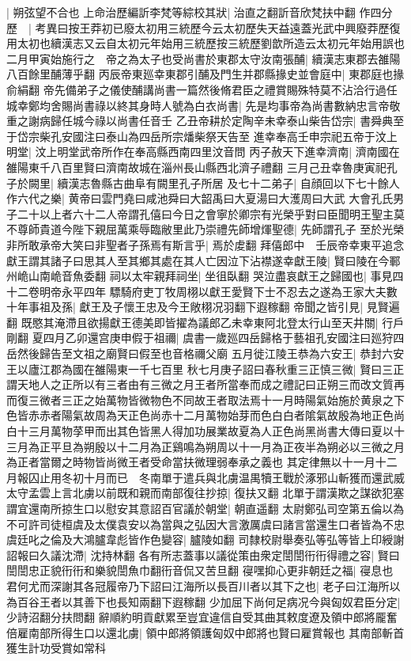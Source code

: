 |{
	朔弦望不合也}
上命治歷編訢李梵等綜校其狀|{
	治直之翻訢音欣梵扶中翻}
作四分歷　|{
	考異曰按王莽初已廢太初用三統歷今云太初歷失天益遠蓋光武中興廢莽歷復用太初也續漢志又云自太初元年始用三統歷按三統歷劉歆所造云太初元年始用誤也}
二月甲寅始施行之　帝之為太子也受尚書於東郡太守汝南張酺|{
	續漢志東郡去雒陽八百餘里酺薄乎翻}
丙辰帝東廵幸東郡引酺及門生并郡縣掾史並會庭中|{
	東郡庭也掾俞絹翻}
帝先備弟子之儀使酺講尚書一篇然後脩君臣之禮賞賜殊特莫不沾洽行過任城幸鄭均舍賜尚書祿以終其身時人號為白衣尚書|{
	先是均事帝為尚書數納忠言帝敬重之謝病歸任城今祿以尚書任音壬}
乙丑帝耕於定陶辛未幸泰山柴告岱宗|{
	書舜典至于岱宗柴孔安國注曰泰山為四岳所宗燔柴祭天告至}
進幸奉高壬申宗祀五帝于汶上明堂|{
	汶上明堂武帝所作在奉高縣西南四里汶音問}
丙子赦天下進幸濟南|{
	濟南國在雒陽東千八百里賢曰濟南故城在淄州長山縣西北濟子禮翻}
三月己丑幸魯庚寅祀孔子於闕里|{
	續漢志魯縣古曲阜有闕里孔子所居}
及七十二弟子|{
	自顔回以下七十餘人}
作六代之樂|{
	黄帝曰雲門堯曰咸池舜曰大韶禹曰大夏湯曰大濩周曰大武}
大會孔氏男子二十以上者六十二人帝謂孔僖曰今日之會寧於卿宗有光榮乎對曰臣聞明王聖主莫不尊師貴道今陛下親屈萬乘辱臨敝里此乃崇禮先師增煇聖德|{
	先師謂孔子}
至於光榮非所敢承帝大笑曰非聖者子孫焉有斯言乎|{
	焉於䖍翻}
拜僖郎中　壬辰帝幸東平追念獻王謂其諸子曰思其人至其鄉其處在其人亡因泣下沾襟遂幸獻王陵|{
	賢曰陵在今鄆州峗山南峗音魚委翻}
祠以太牢親拜祠坐|{
	坐徂臥翻}
哭泣盡哀獻王之歸國也|{
	事見四十二卷明帝永平四年}
驃騎府吏丁牧周栩以獻王愛賢下士不忍去之遂為王家大夫數十年事祖及孫|{
	獻王及子懷王忠及今王敞栩况羽翻下遐稼翻}
帝聞之皆引見|{
	見賢遍翻}
既愍其淹滯且欲揚獻王德美即皆擢為議郎乙未幸東阿北登太行山至天井關|{
	行戶剛翻}
夏四月乙卯還宫庚申假于祖禰|{
	虞書一歲廵四岳歸格于藝祖孔安國注曰廵狩四岳然後歸告至文祖之廟賢曰假至也音格禰父廟}
五月徙江陵王恭為六安王|{
	恭封六安王以廬江郡為國在雒陽東一千七百里}
秋七月庚子詔曰春秋重三正慎三微|{
	賢曰三正謂天地人之正所以有三者由有三微之月王者所當奉而成之禮記曰正朔三而改文質再而復三微者三正之始萬物皆微物色不同故王者取法焉十一月時陽氣始施於黄泉之下色皆赤赤者陽氣故周為天正色尚赤十二月萬物始芽而色白白者隂氣故殷為地正色尚白十三月萬物莩甲而出其色皆黑人得加功展業故夏為人正色尚黑尚書大傳曰夏以十三月為正平旦為朔殷以十二月為正鷄鳴為朔周以十一月為正夜半為朔必以三微之月為正者當爾之時物皆尚微王者受命當扶微理弱奉承之義也}
其定律無以十一月十二月報囚止用冬初十月而已　冬南單于遣兵與北虜温禺犢王戰於涿邪山斬獲而還武威太守孟雲上言北虜以前既和親而南部復往抄掠|{
	復扶又翻}
北單于謂漢欺之謀欲犯塞謂宜還南所掠生口以慰安其意詔百官議於朝堂|{
	朝直遥翻}
太尉鄭弘司空第五倫以為不可許司徒桓虞及太僕袁安以為當與之弘因大言激厲虞曰諸言當還生口者皆為不忠虞廷叱之倫及大鴻臚韋彪皆作色變容|{
	臚陵如翻}
司隸校尉舉奏弘等弘等皆上印綬謝詔報曰久議沈滯|{
	沈持林翻}
各有所志蓋事以議從策由衆定誾誾衎衎得禮之容|{
	賢曰誾誾忠正貌衎衎和樂貌誾魚巾翻衎音侃又苦旦翻}
寑嘿抑心更非朝廷之福|{
	寑息也}
君何尤而深謝其各冠履帝乃下詔曰江海所以長百川者以其下之也|{
	老子曰江海所以為百谷王者以其善下也長知兩翻下遐稼翻}
少加屈下尚何足病况今與匈奴君臣分定|{
	少詩沼翻分扶問翻}
辭順約明貢獻累至豈宜違信自受其曲其敕度遼及領中郎將龎奮倍雇南部所得生口以還北虜|{
	領中郎將領護匈奴中郎將也賢曰雇賞報也}
其南部斬首獲生計功受賞如常科

